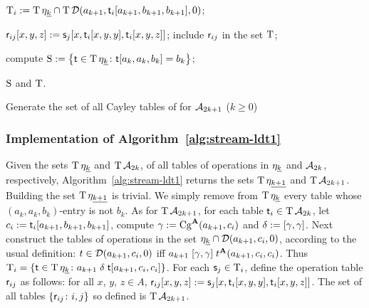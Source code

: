 \begin{algorithm}


   {

    $\operatorname{T}_i := \operatorname{T} \eta_{\underline{k}} \cap \operatorname{T} \mathcal{D} (a_{k+1}, \mathsf{t}_i[a_{k+1}, b_{k+1}, b_{k+1}], 0)$;

     {
        {
        $\mathsf{r}_{ij}[x,y,z] :=  \mathsf{s}_j[x, \mathsf{t}_i[x,y,y], \mathsf{t}_i[x,y,z]]$;
      }
      include $\mathsf{r}_{ij}$ in the set $\operatorname{T}$;
    }
  }
  compute $\operatorname{S}  := \bigl\{\mathsf{t} \in \operatorname{T} \eta_{\underline{k}} \colon \mathsf{t}[a_k,a_k,b_k]= b_k \bigr\}$;

  \Return $\operatorname{S}$ and $\operatorname{T}$.
  \caption{Generate the set of all Cayley tables of \ldtos for $\mathcal{A}_{2k+1}$ \label{alg:stream-ldt1} {\small ($k\geq 0$)}}
\end{algorithm}

\subsubsection{Implementation of Algorithm~\ref{alg:stream-ldt1}}
Given the sets $\operatorname{T} \eta_{\underline{k}}$
and $\operatorname{T} \mathcal{A}_{2k}$, of all tables of operations in
$\eta_{\underline{k}}$ and $\mathcal{A}_{2k}$, respectively,
Algorithm~\ref{alg:stream-ldt1} returns the sets
$\operatorname{T} \eta_{\underline{k+1}}$ and $\operatorname{T} \mathcal{A}_{2k+1}$.
Building the set $\operatorname{T} \eta_{\underline{k+1}}$ is trivial.  We simply remove
from $\operatorname{T} \eta_{\underline{k}}$ every table whose $(a_k,a_k,b_k)$-entry is not $b_k$.
As for $\operatorname{T} \mathcal{A}_{2k+1}$,
for each table $\mathsf{t}_i \in \operatorname{T} \mathcal{A}_{2k}$,
let
$c_i:= \mathsf{t}_i[a_{k+1}, b_{k+1}, b_{k+1}]$, compute
$\gamma := \operatorname{Cg}^{\mathbf{A}}(a_{k+1}, c_i)$ and $\delta := [\gamma, \gamma]$. %
Next construct the tables of operations in the set
$\eta_{\underline{k}}\cap \mathcal{D} (a_{k+1}, c_i, 0)$, according to the usual
definition:
$t \in \mathcal{D} (a_{k+1},c_i,0)$ iff $a_{k+1} \mathrel{[\gamma, \gamma]} t^{\mathbf{A}}(a_{k+1},c_i,c_i)$.
Thus
$\operatorname{T}_i = \{\mathsf{t} \in \operatorname{T} \eta_{\underline{k}} \colon  a_{k+1} \mathrel{\delta} \mathsf{t} [a_{k+1}, c_i, c_i]\}$.
For each $\mathsf{s}_j \in \operatorname{T}_i$, define the operation table $\mathsf{r}_{ij}$ as follows:
for all $x$, $y$, $z \in A$, $\mathsf{r}_{ij}[x,y,z] :=  \mathsf{s}_j[x, \mathsf{t}_i[x,y,y], \mathsf{t}_i[x,y,z]]$.
The set of all tables $\{\mathsf{r}_{ij} \colon i, j\}$ so defined is $\operatorname{T} \mathcal{A}_{2k+1}$.



